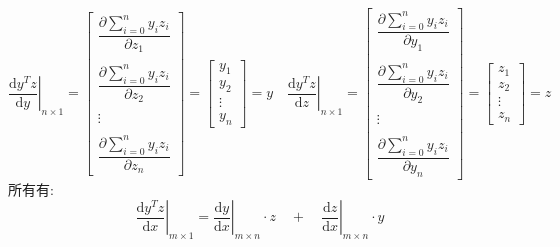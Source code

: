 \documentclass[withoutpreface,bwprint]{cumcmthesis} %
\begin{document}
	\begin{equation}
		\left.\dfrac{\mathrm{d} y^{T}z}{\mathrm{d} y}\right|_{n{\times}1}=\left[
			\begin{array}{c}
			\dfrac{\partial \sum_{i=0}^{n} y_iz_i}{\partial z_1}\\\\
			\dfrac{\partial \sum_{i=0}^{n} y_iz_i}{\partial z_2}\\\\
			\vdots\\\\
			\dfrac{\partial \sum_{i=0}^{n} y_iz_i}{\partial z_n}			
		\end{array}		
		\right]=\left[
		\begin{array}{c}
			y_1\\
			y_2\\
			\vdots\\
			y_n		
		\end{array}		
		\right]=y 
		\quad 
		\left.\dfrac{\mathrm{d} y^{T}z}{\mathrm{d} z}\right|_{n{\times}1}=\left[
		\begin{array}{c}
			\dfrac{\partial \sum_{i=0}^{n} y_iz_i}{\partial y_1}\\\\
			\dfrac{\partial \sum_{i=0}^{n} y_iz_i}{\partial y_2}\\\\
			\vdots\\\\
			\dfrac{\partial \sum_{i=0}^{n} y_iz_i}{\partial y_n}			
		\end{array}		
		\right]=\left[
		\begin{array}{c}
			z_1\\
			z_2\\
			\vdots\\
			z_n		
		\end{array}		
		\right]=z
	\end{equation}
	所有有:
	\begin{equation}
		\left.\dfrac{\mathrm{d} y^{T}z}{\mathrm{d} x}\right|_{m{\times}1}
		=\left.\dfrac{\mathrm{d} y}{\mathrm{d} x}\right|_{m{\times}n}
		\cdot
		z\quad
		+\quad
		\left.\dfrac{\mathrm{d} z}{\mathrm{d} x}\right|_{m{\times}n}
		\cdot
		y
	\end{equation}
\end{document}
